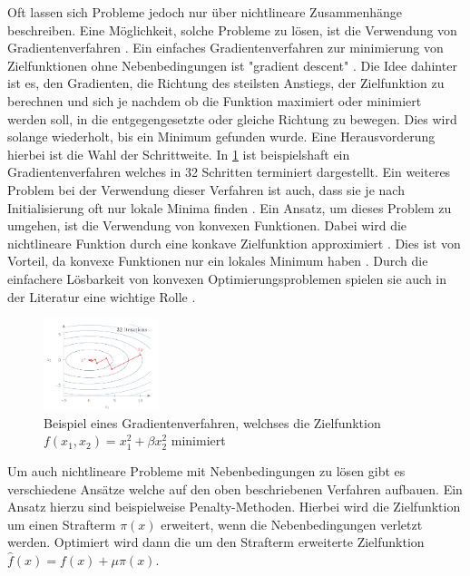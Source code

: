 Oft lassen sich Probleme jedoch nur über nichtlineare Zusammenhänge beschreiben.
Eine Möglichkeit, solche Probleme zu lösen, ist die Verwendung von
Gradientenverfahren \cite[153]{marti21bo}. Ein einfaches Gradientenverfahren zur
minimierung von Zielfunktionen ohne Nebenbedingungen ist "gradient descent"
\cite[110]{marti21bo}. Die Idee dahinter ist es, den Gradienten, die Richtung
des steilsten Anstiegs, der Zielfunktion zu berechnen und sich je nachdem ob die
Funktion maximiert oder minimiert werden soll, in die entgegengesetzte oder
gleiche Richtung zu bewegen. Dies wird solange wiederholt, bis ein Minimum
gefunden wurde. Eine Herausvorderung hierbei ist die Wahl der Schrittweite. In
\ref*{fig:gradient} ist beispielshaft ein Gradientenverfahren welches in 32
Schritten terminiert dargestellt. Ein weiteres Problem bei der Verwendung dieser
Verfahren ist auch, dass sie je nach Initialisierung oft nur lokale Minima
finden \cite[9]{boyd04bo}. Ein Ansatz, um dieses Problem zu umgehen, ist die
Verwendung von konvexen Funktionen. Dabei wird die nichtlineare Funktion durch
eine konkave Zielfunktion approximiert \cite[11]{boyd04bo}. Dies ist von
Vorteil, da konvexe Funktionen nur ein lokales Minimum haben
\cite[7]{noced06bo}. Durch die einfachere Lösbarkeit von konvexen
Optimierungsproblemen spielen sie auch in der Literatur eine wichtige Rolle
\cite[8]{boyd04bo}.

\begin{figure}[h]
    \centering
    \includegraphics[width=0.3\textwidth]{figures/[marti21bo Gradient].png}
    \caption{Beispiel eines Gradientenverfahren, welchses die Zielfunktion \\
    $f(x_1,x_2)=x_1^2+\beta x_2^2$ minimiert  \cite[112]{marti21bo}}
    \label{fig:gradient}
\end{figure}

Um auch nichtlineare Probleme mit Nebenbedingungen zu lösen gibt es verschiedene
Ansätze welche auf den oben beschriebenen Verfahren aufbauen. Ein Ansatz hierzu
sind beispielweise Penalty-Methoden. Hierbei wird die Zielfunktion um einen Strafterm $\pi(x)$
erweitert, wenn die Nebenbedingungen verletzt werden. Optimiert wird dann die
um den Strafterm erweiterte Zielfunktion $\hat{f}(x)=f(x)+\mu\pi(x)$.
\cite[175]{marti21bo}



